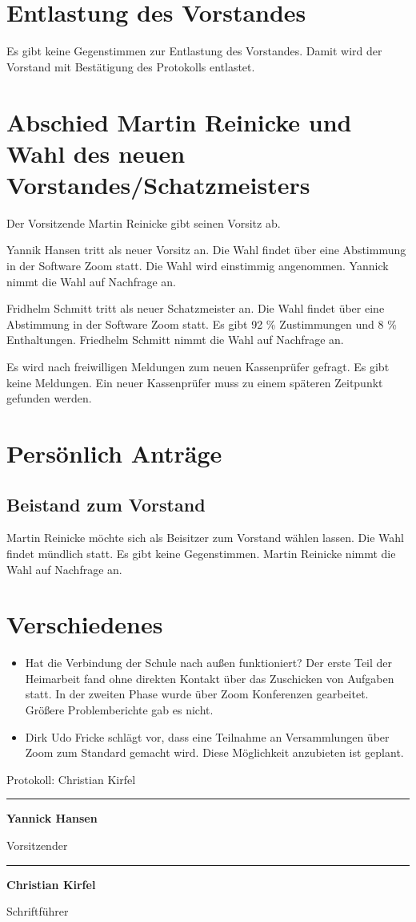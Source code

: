 \documentclass[a4paper, 11pt]{article}
\newcommand\signature[2]{%
\noindent\begin{minipage}{5cm}
    \noindent\vspace{3cm}\par
    \noindent\rule{5cm}{1pt}\par
    \noindent\textbf{#1}\par
    \noindent#2%
\end{minipage}}
\begin{document}
\section*{Entlastung des Vorstandes}

Es gibt keine Gegenstimmen zur Entlastung des Vorstandes. Damit wird der Vorstand mit Bestätigung des Protokolls entlastet.


\section*{Abschied Martin Reinicke und Wahl des neuen Vorstandes/Schatzmeisters}

Der Vorsitzende Martin Reinicke gibt seinen Vorsitz ab.

Yannik Hansen tritt als neuer Vorsitz an.
Die Wahl findet über eine Abstimmung in der Software Zoom statt.
Die Wahl wird einstimmig angenommen.
Yannick nimmt die Wahl auf Nachfrage an.

Fridhelm Schmitt tritt als neuer Schatzmeister an.
Die Wahl findet über eine Abstimmung in der Software Zoom statt.
Es gibt 92 \% Zustimmungen und 8 \% Enthaltungen.
Friedhelm Schmitt nimmt die Wahl auf Nachfrage an.

Es wird nach freiwilligen Meldungen zum neuen Kassenprüfer gefragt.
Es gibt keine Meldungen. Ein neuer Kassenprüfer muss zu einem späteren Zeitpunkt gefunden werden.

\section*{Persönlich Anträge}

\subsection*{Beistand zum Vorstand}

Martin Reinicke möchte sich als Beisitzer zum Vorstand wählen lassen.
Die Wahl findet mündlich statt.
Es gibt keine Gegenstimmen.
Martin Reinicke nimmt die Wahl auf Nachfrage an.

\section*{Verschiedenes}

\begin{itemize}
    \item Hat die Verbindung der Schule nach außen funktioniert? Der erste Teil der Heimarbeit fand ohne direkten Kontakt über das Zuschicken von Aufgaben statt. In der zweiten Phase wurde über Zoom Konferenzen gearbeitet. Größere Problemberichte gab es nicht.
    \item Dirk Udo Fricke schlägt vor, dass eine Teilnahme an Versammlungen über Zoom zum Standard gemacht wird. Diese Möglichkeit anzubieten ist geplant.
\end{itemize}

\newpage

Protokoll: Christian Kirfel


\signature{Yannick Hansen}{Vorsitzender}\hfill\signature{Christian Kirfel}{Schriftführer}
\end{document}
